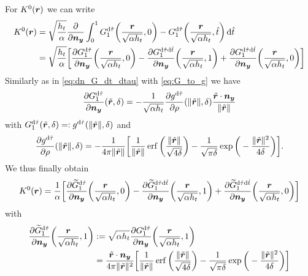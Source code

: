 \documentclass[a4paper,11pt]{article}
\begin{document}
For $K^0({{\bm{r}}})$ we can write
\begin{align*}
  K^0({{\bm{r}}}) &= \sqrt{\frac{h_t}{\alpha}} \frac{\partial}{\partial {\ensuremath{{\bm{n}}}}_{{\bm{y}}}} \int_{0}^{1} G^{{\mathrm{d}}\hat \tau}_1\bigg(\frac{{{\bm{r}}}}{\sqrt{\alpha h_t}},0\bigg) - G^{{\mathrm{d}}\hat \tau}_1\bigg(\frac{{{\bm{r}}}}{\sqrt{\alpha h_t}},\hat t\bigg) \,{\mathrm{d}}\hat t \\
  &= \sqrt{\frac{h_t}{\alpha}} \bigg[ \frac{\partial G^{{\mathrm{d}}\hat \tau}_1}{\partial {\ensuremath{{\bm{n}}}}_{{\bm{y}}}} \bigg(\frac{{{\bm{r}}}}{\sqrt{\alpha h_t}},0\bigg) - \frac{\partial G^{{\mathrm{d}}\hat\tau{\mathrm{d}}\hat t}_1}{\partial {\ensuremath{{\bm{n}}}}_{{\bm{y}}}}\bigg(\frac{{{\bm{r}}}}{\sqrt{\alpha h_t}},1\bigg) + \frac{\partial G^{{\mathrm{d}}\hat\tau{\mathrm{d}}\hat t}_1}{\partial {\ensuremath{{\bm{n}}}}_{{\bm{y}}}}\bigg(\frac{{{\bm{r}}}}{\sqrt{\alpha h_t}},0\bigg) \bigg]
\end{align*}
Similarly as in \eqref{eq:dn_G_dt_dtau} with \eqref{eq:G_to_g} we have
\begin{equation*}
  \frac{\partial G^{{\mathrm{d}}\hat\tau}_1}{\partial {\ensuremath{{\bm{n}}}}_{{\bm{y}}}}(\tilde {{{\bm{r}}}},\delta) = -\frac{1}{\sqrt{\alpha h_t}} \frac{\partial g^{{\mathrm{d}}\hat\tau}}{\partial \rho}(\|\tilde {{{\bm{r}}}}\|,\delta) \frac{\tilde {{{\bm{r}}}} \cdot {\ensuremath{{\bm{n}}}}_{{\bm{y}}}}{\|\tilde {{{\bm{r}}}}\|}
\end{equation*}
with $G^{{\mathrm{d}}\hat\tau}_1(\tilde{{{\bm{r}}}},\delta) =: g^{{\mathrm{d}}\hat\tau}(\|\tilde{{{\bm{r}}}}\|,\delta)$ and 
\begin{equation*}
  \frac{\partial g^{{\mathrm{d}}\hat\tau}}{\partial \rho}(\|\tilde {{{\bm{r}}}}\|,\delta) = -\frac{1}{4\pi\|\tilde{{{\bm{r}}}}\|} \bigg[ \frac{1}{\|\tilde {{{\bm{r}}}}\|} \operatorname{erf}\bigg( \frac{\|\tilde {{{\bm{r}}}}\|}{\sqrt{4\delta}} \bigg) - \frac{1}{\sqrt{\pi\delta}} \exp\bigg( -\frac{\|\tilde {{{\bm{r}}}}\|^2}{4\delta} \bigg) \bigg].
\end{equation*}
We thus finally obtain
\begin{equation*}
  K^0({{\bm{r}}}) = \frac{1}{\alpha} \bigg[ \frac{\partial \widetilde G^{{\mathrm{d}}\hat \tau}_1}{\partial {\ensuremath{{\bm{n}}}}_{{\bm{y}}}} \bigg(\frac{{{\bm{r}}}}{\sqrt{\alpha h_t}},0\bigg) - \frac{\partial \widetilde G^{{\mathrm{d}}\hat\tau{\mathrm{d}}\hat t}_1}{\partial {\ensuremath{{\bm{n}}}}_{{\bm{y}}}}\bigg(\frac{{{\bm{r}}}}{\sqrt{\alpha h_t}},1\bigg) + \frac{\partial \widetilde G^{{\mathrm{d}}\hat\tau{\mathrm{d}}\hat t}_1}{\partial {\ensuremath{{\bm{n}}}}_{{\bm{y}}}}\bigg(\frac{{{\bm{r}}}}{\sqrt{\alpha h_t}},0\bigg) \bigg]
\end{equation*}
with 
\begin{equation}
\label{eq:dn_G_dtau}
\begin{aligned}
   \frac{\partial \widetilde G^{{\mathrm{d}}\hat\tau}_1}{\partial {\ensuremath{{\bm{n}}}}_{{\bm{y}}}}\bigg(\frac{{{\bm{r}}}}{\sqrt{\alpha h_t}},1\bigg) &:= \sqrt{\alpha h_t} \frac{\partial G^{{\mathrm{d}}\hat\tau}_1}{\partial {\ensuremath{{\bm{n}}}}_{{\bm{y}}}}\bigg(\frac{{{\bm{r}}}}{\sqrt{\alpha h_t}},1\bigg) \\
   &= \frac{\tilde {{{\bm{r}}}} \cdot {\ensuremath{{\bm{n}}}}_{{\bm{y}}}}{4\pi\|\tilde{{{\bm{r}}}}\|^2} \bigg[ \frac{1}{\|\tilde {{{\bm{r}}}}\|} \operatorname{erf}\bigg( \frac{\|\tilde {{{\bm{r}}}}\|}{\sqrt{4\delta}} \bigg) - \frac{1}{\sqrt{\pi\delta}} \exp\bigg( -\frac{\|\tilde {{{\bm{r}}}}\|^2}{4\delta} \bigg) \bigg]
\end{aligned}
\end{equation}
\end{document}
